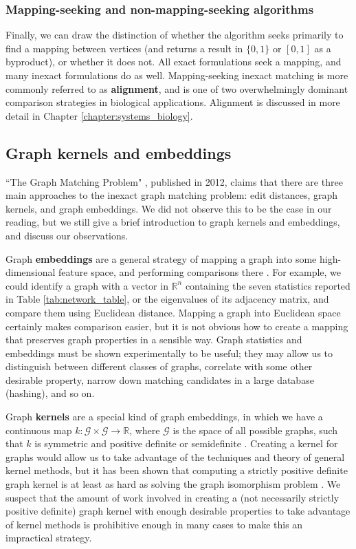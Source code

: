 \documentclass[12pt]{thesis}
\theoremstyle{plain}
\theoremstyle{definition}
\theoremstyle{remark}
\newcommand{\R}{\mathbb{R}}
\begin{document}
\subsubsection{Mapping-seeking and non-mapping-seeking algorithms} 

Finally, we can draw the distinction of whether the algorithm seeks primarily to find a mapping between vertices (and returns a result in $\{0,1\}$ or $[0,1]$ as a byproduct), or whether it does not. All exact formulations seek a mapping, and many inexact formulations do as well. Mapping-seeking inexact matching is more commonly referred to as \textbf{alignment}, and is one of two overwhelmingly dominant comparison strategies in biological applications. Alignment is discussed in more detail in Chapter \ref{chapter:systems_biology}.

\subsection{Graph kernels and embeddings}

``The Graph Matching Problem" \cite{Livi_2012}, published in 2012, claims that there are three main approaches to the inexact graph matching problem: edit distances, graph kernels, and graph embeddings. We did not observe this to be the case in our reading, but we still give a brief introduction to graph kernels and embeddings, and discuss our observations.

Graph \textbf{embeddings} are a general strategy of mapping a graph into some high-dimensional feature space, and performing comparisons there \cite{Emmert_Streib_2011}. For example, we could identify a graph with a vector in $\R^n$ containing the seven statistics reported in Table \ref{tab:network_table}, or the eigenvalues of its adjacency matrix, and compare them using Euclidean distance. Mapping a graph into Euclidean space certainly makes comparison easier, but it is not obvious how to create a mapping that preserves graph properties in a sensible way. Graph statistics and embeddings must be shown experimentally to be useful; they may allow us to distinguish between different classes of graphs, correlate with some other desirable property, narrow down matching candidates in a large database (hashing), and so on.

Graph \textbf{kernels} are a special kind of graph embeddings, in which we have a continuous map $k:\mathcal{G}\times \mathcal{G}\rightarrow \R$, where $\mathcal{G}$ is the space of all possible graphs, such that $k$ is symmetric and positive definite or semidefinite \cite{Livi_2012}. Creating a kernel for graphs would allow us to take advantage of the techniques and theory of general kernel methods, but it has been shown that computing a strictly positive definite graph kernel is at least as hard as solving the graph isomorphism problem \cite{Gartner_2003}. We suspect that the amount of work involved in creating a (not necessarily strictly positive definite) graph kernel with enough desirable properties to take advantage of kernel methods is prohibitive enough in many cases to make this an impractical strategy.
\end{document}
